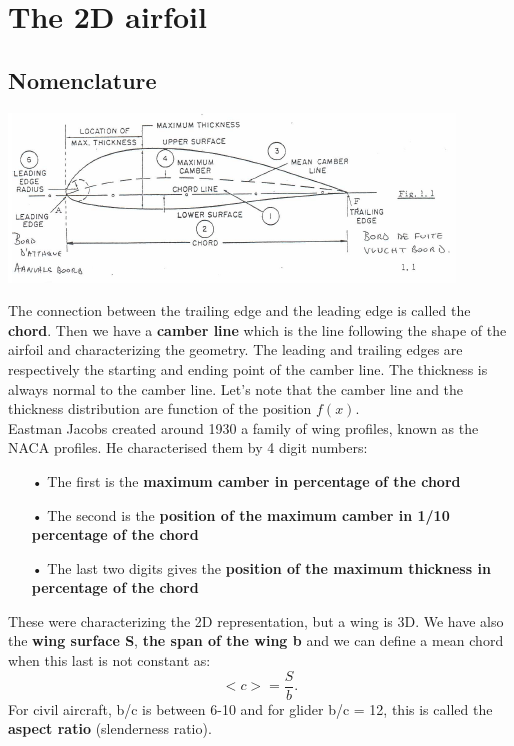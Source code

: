 
\chapter{The 2D airfoil}
	\section{Nomenclature}
		
		\begin{center}
		\includegraphics[scale=1]{ch2/1}
		\end{center}
		
		The connection between the trailing edge and the leading edge is called the \textbf{chord}. Then we have a \textbf{camber line} which is the line following the shape of the airfoil and characterizing the geometry. The leading and trailing edges are respectively the starting and ending point of the camber line. The thickness is always normal to the camber line. Let's note that the camber line and the thickness distribution are function of the position $f(x)$. \\
		
		Eastman Jacobs created around 1930 a family of wing profiles, known as the NACA profiles. He characterised them by 4 digit numbers: 
		
		\begin{itemize}
			\item[•] The first is the \textbf{maximum camber in percentage of the chord} 
			\item[•] The second is the \textbf{position of the maximum camber in 1/10 percentage of the chord}
			\item[•] The last two digits gives the \textbf{position of the maximum thickness in percentage of the chord}\\
		\end{itemize}				
		
		These were characterizing the 2D representation, but a wing is 3D. We have also the \textbf{wing surface S}, \textbf{the span of the wing b} and we can define a mean chord when this last is not constant as: 
		\begin{equation}
		<c> = \frac{S}{b}.
		\end{equation}				
		 For civil aircraft, b/c is between 6-10 and for glider b/c = 12, this is called the \textbf{aspect ratio} (slenderness ratio). 
		 
